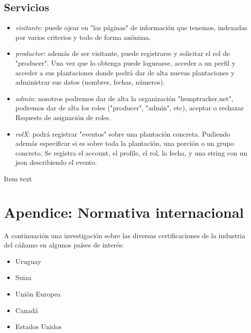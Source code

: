 \documentclass{article}
\begin{document}
\subsection{Servicios}

\begin{itemize}
	\item \textit{visitante}: puede ojear en "las páginas" de información que tenemos, indexadas por varios criterios y todo de forma anónima.
	\item \textit{productor}: además de ser visitante, puede registrarse y solicitar el rol de "producer". Una vez que lo obtenga puede loguearse, acceder a un perfil y acceder a sus plantaciones donde podrá dar de alta nuevas plantaciones y administrar sus datos (nombres, fechas, números).
	\item \textit{admin}: nosotros podremos dar de alta la organización "hemptracker.net", podremos dar de alta los roles ("producer", "admin", etc), aceptar o rechazar Requests de asignación de roles. 
	\item \textit{rolX}: podrá registrar "eventos" sobre una plantación concreta. Pudiendo además especificar si es sobre toda la plantación, una porción o un grupo concreto. Se registra el account, el profile, el rol, la fecha, y una string con un json describiendo el evento.
\end{itemize}


\newpage

\begin{thebibliography}{120}

	 Item text

\end{thebibliography}

\newpage

\section{Apendice: Normativa internacional}

A continuación una investigación sobre las diversas certificaciones de la industria del cáñamo en algunos países de interés:

\begin{itemize}
	\item Uruguay
	\item Suiza
	\item Unión Europea
	\item Canadá
	\item Estados Unidos
\end{itemize}
\end{document}
